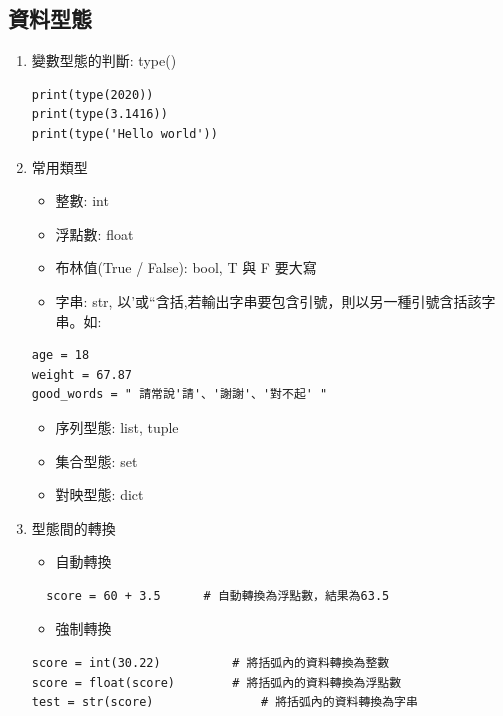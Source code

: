 \documentclass[a4paper,12pt]{article}
\begin{document}
\subsection{資料型態}
\label{sec:org121bca6}
\begin{enumerate}
\item 變數型態的判斷: type()
\label{sec:org49a5b85}
\lstset{breaklines=true,language=Python,label= ,caption= ,captionpos=b,firstnumber=1,numbers=left}
\begin{lstlisting}
print(type(2020))
print(type(3.1416))
print(type('Hello world'))
\end{lstlisting}

\item 常用類型
\label{sec:org1ab3904}
\begin{itemize}
\item 整數: int\\
\item 浮點數: float\\
\item 布林值(True / False): bool, T 與 F 要大寫\\
\item 字串: str, 以'或``含括,若輸出字串要包含引號，則以另一種引號含括該字串。如:\\
\end{itemize}
\lstset{breaklines=true,language=Python,label= ,caption= ,captionpos=b,firstnumber=1,numbers=left}
\begin{lstlisting}
age = 18
weight = 67.87
good_words = " 請常說'請'、'謝謝'、'對不起' "
\end{lstlisting}
\begin{itemize}
\item 序列型態: list, tuple\\
\item 集合型態: set\\
\item 對映型態: dict\\
\end{itemize}

\item 型態間的轉換
\label{sec:org3018479}
\begin{itemize}
\item 自動轉換\\
\end{itemize}
\lstset{breaklines=true,language=Python,label= ,caption= ,captionpos=b,firstnumber=1,numbers=left}
\begin{lstlisting}
  score = 60 + 3.5		# 自動轉換為浮點數，結果為63.5	
\end{lstlisting}
\begin{itemize}
\item 強制轉換\\
\end{itemize}
\lstset{breaklines=true,language=Python,label= ,caption= ,captionpos=b,firstnumber=1,numbers=left}
\begin{lstlisting}
score = int(30.22)			# 將括弧內的資料轉換為整數
score = float(score)		# 將括弧內的資料轉換為浮點數
test = str(score)				# 將括弧內的資料轉換為字串
\end{lstlisting}
\end{enumerate}
\end{document}
